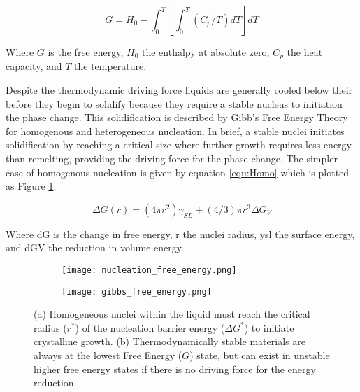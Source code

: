 \documentclass[draft,a4paper,12pt,oneside]{report}%
\begin{document}
\begin{equation}
	G = H_{0}-\int_{0}^{T} 
	\left[
	\int_{0}^{T}(C_{p}/T) dT
	\right] dT
	\label{equ:Gibbs}
\end{equation}

Where $G$ is the free energy, $H_{0}$ the enthalpy at absolute zero, $C_{p}$ the heat capacity, and $T$ the temperature.

Despite the thermodynamic driving force liquids are generally cooled below their \Tm before they begin to solidify because they require a stable nucleus to initiation the phase change. This solidification is described by Gibb's Free Energy Theory for homogenous and heterogeneous nucleation. In brief, a stable nuclei initiates solidification by reaching a critical size where further growth requires less energy than remelting, providing the driving force for the phase change. The simpler case of homogenous nucleation is given by equation \ref{equ:Homo} which is plotted as Figure \ref{fig:GibbsNucleation}. 

\begin{equation}
\Delta G(r) = (4 \pi r^2 ) \gamma_{SL}+(4/3) \pi r^3 \Delta G_{V} 
\label{equ:Homo}
\end{equation}

Where \acrshort{dG} is the change in free energy, \acrshort{r} the nuclei radius, \acrshort{ysl} the surface energy, and \acrshort{dGV} the reduction in volume energy.

\begin{figure}[bp]
	\centering
	\begin{subfigure}[htbp]{0.49\textwidth}
		\texttt{[image: nucleation\_free\_energy.png]}
		\caption{}
		\label{fig:GibbsNucleation}
	\end{subfigure}
	\begin{subfigure}[htbp]{0.49\textwidth}
		\texttt{[image: gibbs\_free\_energy.png]}
		\caption{}
		\label{fig:FreeEnergy}
	\end{subfigure}
	\caption[Homogenous Nucleation]{(a) Homogeneous nuclei within the liquid must reach the critical radius ($r^*$) of the nucleation barrier energy ($\Delta G^*$) to initiate crystalline growth. (b) Thermodynamically stable materials are always at the lowest Free Energy ($G$) state, but can exist in unstable higher free energy states if there is no driving force for the energy reduction.}%
	\label{fig:Gibbs}
\end{figure}
\end{document}
